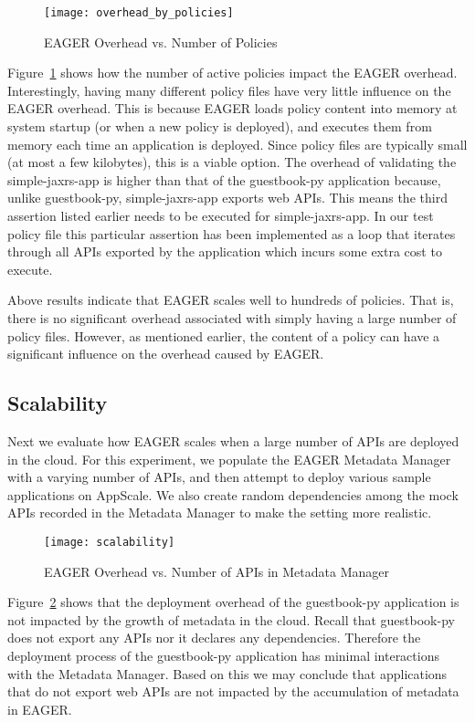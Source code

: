 \begin{figure}
\centering
\texttt{[image: overhead\_by\_policies]}
\caption{EAGER Overhead vs. Number of Policies}
\label{fig:overhead_by_policies}
\end{figure}

Figure~\ref{fig:overhead_by_policies} shows how the number of active policies impact the EAGER overhead. Interestingly, having many
different policy files have very little influence on the EAGER overhead. This is because EAGER loads policy content into memory at system
startup (or when a new policy is deployed), and executes them from memory each time an application is deployed. Since policy files are 
typically small (at most a few kilobytes), this is a viable option. The overhead of validating the simple-jaxrs-app is higher than that of the
guestbook-py application because, unlike guestbook-py, simple-jaxrs-app exports web APIs. This means the third assertion listed earlier
needs to be executed for simple-jaxrs-app. In our test policy file this particular assertion has been implemented as a loop that iterates through 
all APIs exported by the application which incurs some extra cost to execute.

Above results indicate that EAGER scales well to hundreds of policies. That is, there is no significant overhead associated with simply having
a large number of policy files. However, as mentioned earlier, the content of a policy can have a significant influence on the overhead
 caused by EAGER.
 
\subsection{Scalability}
Next we evaluate how EAGER scales when a large number of APIs are deployed in the cloud. For this experiment, we populate the EAGER
Metadata Manager with a varying number of APIs, and then attempt to deploy various sample applications on AppScale. We also create
random dependencies among the mock APIs recorded in the Metadata Manager to make the setting more realistic.

\begin{figure}
\centering
\texttt{[image: scalability]}
\caption{EAGER Overhead vs. Number of APIs in Metadata Manager}
\label{fig:scalability}
\end{figure}

Figure~\ref{fig:scalability} shows that the deployment overhead of the guestbook-py application is not impacted by the growth of metadata
in the cloud. Recall that guestbook-py does not export any APIs nor it declares any dependencies. Therefore the deployment process of
the guestbook-py application has minimal interactions with the Metadata Manager. Based on this we may conclude that applications that
do not export web APIs are not impacted by the accumulation of metadata in EAGER.

